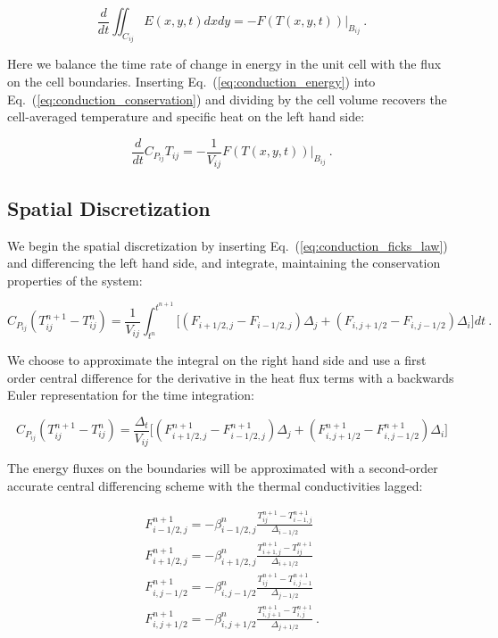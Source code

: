\documentclass[letterpaper,12pt]{article}
\begin{document}
\begin{equation}
  \frac{d}{dt} \iint_{C_{ij}} E(x,y,t) dx dy = -F(T(x,y,t))
  |_{B_{ij}}\:.
  \label{eq:conduction_conservation}
\end{equation}

Here we balance the time rate of change in energy in the unit cell
with the flux on the cell boundaries. Inserting
Eq.~(\ref{eq:conduction_energy}) into
Eq.~(\ref{eq:conduction_conservation}) and dividing by the cell volume
recovers the cell-averaged temperature and specific heat on the left
hand side:

\begin{equation}
  \frac{d}{dt} C_{P_{ij}} T_{ij} = -\frac{1}{V_{ij}}F(T(x,y,t))
  |_{B_{ij}}\:.
  \label{eq:conduction_cell_averaged}
\end{equation}

\subsection{Spatial Discretization}

We begin the spatial discretization by inserting
Eq.~(\ref{eq:conduction_ficks_law}) and differencing the left hand
side, and integrate, maintaining the conservation properties of the
system:

\begin{equation}
  C_{P_{ij}} ( T^{n+1}_{ij} - T^n_{ij} ) = \frac{1}{V_{ij}}
  \int_{t^n}^{t^{n+1}} \Big[(F_{i+1/2,j}-F_{i-1/2,j})\Delta_j +
    (F_{i,j+1/2}-F_{i,j-1/2})\Delta_i \Big] dt\:.
  \label{eq:conduction_time_integral}
\end{equation}

We choose to approximate the integral on the right hand side and use a
first order central difference for the derivative in the heat flux
terms with a backwards Euler representation for the time integration:

\begin{equation}
  C_{P_{ij}}( T^{n+1}_{ij} - T^n_{ij} ) = \frac{\Delta_t}{V_{ij}}
  \Big[ (F^{n+1}_{i+1/2,j}-F^{n+1}_{i-1/2,j})\Delta_j +
    (F^{n+1}_{i,j+1/2}-F^{n+1}_{i,j-1/2})\Delta_i \Big]
  \label{eq:conduction_fv_equation}
\end{equation}

The energy fluxes on the boundaries will be approximated with a
second-order accurate central differencing scheme with the thermal
conductivities lagged:

\begin{equation}
  \begin{aligned}
  F^{n+1}_{i-1/2,j} = -\beta^n_{i-1/2,j} \frac{T^{n+1}_{ij}
    -T^{n+1}_{i-1,j}}{\Delta_{i-1/2}} \\ F^{n+1}_{i+1/2,j} =
  -\beta^n_{i+1/2,j} \frac{T^{n+1}_{i+1,j}
    -T^{n+1}_{ij}}{\Delta_{i+1/2}} \\ F^{n+1}_{i,j-1/2} =
  -\beta^n_{i,j-1/2} \frac{T^{n+1}_{ij}
    -T^{n+1}_{i,j-1}}{\Delta_{j-1/2}} \\ F^{n+1}_{i,j+1/2} =
  -\beta^n_{i,j+1/2} \frac{T^{n+1}_{i,j+1}
    -T^{n+1}_{i,j}}{\Delta_{j+1/2}}\:.
    \label{eq:conduction_fluxes}
  \end{aligned}
\end{equation}
\end{document}
